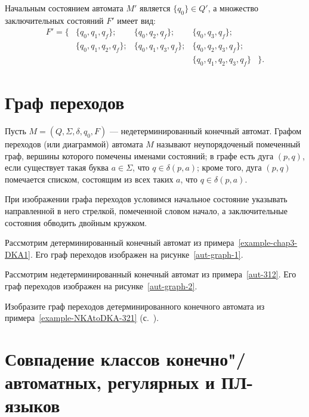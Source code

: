 \begin{myexample}


Начальным состоянием автомата $M'$ является $\{q_0\}\in Q'$, а множество заключительных состояний $F'$ имеет вид:
\[\begin{array}{rllll}
F' = \{
	& \{q_0,q_1,q_f\};     & \{q_0,q_2,q_f\};     & \{q_0,q_3,q_f\};&\\
	& \{q_0,q_1,q_2,q_f\}; & \{q_0,q_1,q_3,q_f\}; & \{q_0,q_2,q_3,q_f\};&\\
	& & & \{q_0,q_1,q_2,q_3,q_f \} & \}.
\end{array}\]
\end{myexample}

\section{Граф переходов}
\label{Chapter3Graph}
Пусть $M=(Q,\Sigma,\delta,q_0,F)$ --- недетерминированный конечный автомат. Графом переходов (или диаграммой) автомата $M$ называют неупорядоченый помеченный граф, вершины которого помечены именами состояний; в графе есть дуга $(p,q)$, если существует такая буква $a\in\Sigma$, что $q\in\delta(p,a)$; кроме того, дуга $(p,q)$ помечается списком, состоящим из всех таких $a$, что $q\in\delta(p,a)$.

При изображении графа переходов условимся начальное состояние указывать направленной в него стрелкой, помеченной словом начало, а заключительные состояния обводить двойным кружком.

\begin{myexample}
Рассмотрим детерминированный конечный автомат из примера~\ref{example-chap3-DKA1}. Его граф переходов изображен на рисунке~\ref{aut-graph-1}.

\end{myexample}

\begin{myexample}
Рассмотрим недетерминированный конечный автомат из примера~\ref{aut-312}. Его граф переходов изображен на рисунке~\ref{aut-graph-2}.
\end{myexample}



\begin{myproblem}
Изобразите граф переходов детерминированного конечного автомата из примера~\ref{example-NKAtoDKA-321} (с.~\pageref{example-NKAtoDKA-321}).
\end{myproblem}

\section[Совпадение классов КА-, регулярных и ПЛ-языков]{Совпадение классов конечно"/автоматных, регулярных и ПЛ-языков}
\label{Chapter3MathesFARL}

